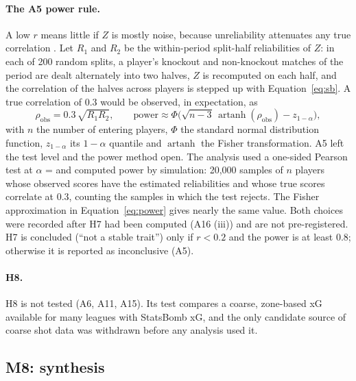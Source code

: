 \documentclass[11pt,a4paper]{article}
\begin{document}
\paragraph{The A5 power rule.}
A low $r$ means little if $Z$ is mostly noise, because unreliability
attenuates any true correlation \citep{spearman1904proof}. Let $R_1$ and $R_2$
be the within-period split-half reliabilities of $Z$: in each of 200 random
splits, a player's knockout and non-knockout matches of the period are dealt
alternately into two halves, $Z$ is recomputed on each half, and the
correlation of the halves across players is stepped up with
Equation~\eqref{eq:sb}. A true correlation of 0.3 would be observed, in
expectation, as
\begin{equation}
  \rho_{\text{obs}} = 0.3\,\sqrt{R_1 R_2},
  \qquad
  \text{power} \approx \Phi\big(\sqrt{n - 3}\,\operatorname{artanh}(\rho_{\text{obs}}) - z_{1-\alpha}\big),
  \label{eq:power}
\end{equation}
with $n$ the number of entering players, $\Phi$ the standard normal distribution
function, $z_{1-\alpha}$ its $1-\alpha$ quantile and $\operatorname{artanh}$ the
Fisher transformation. A5 left the test level and the power method open. The
analysis used a one-sided Pearson test at $\alpha$ = \HSevenAlpha{} and
computed power by simulation: 20,000 samples of $n$ players whose observed
scores have the estimated reliabilities and whose true scores correlate at 0.3,
counting the samples in which the test rejects. The Fisher approximation in
Equation~\eqref{eq:power} gives nearly the same value. Both choices were
recorded after H7 had been computed (A16 (iii)) and are not pre-registered.
H7 is concluded (``not a stable trait'') only if $r < 0.2$ and the power is at
least 0.8; otherwise it is reported as inconclusive (A5).

\paragraph{H8.}
H8 is not tested (A6, A11, A15). Its test compares a coarse, zone-based xG
available for many leagues with StatsBomb xG, and the only candidate source of
coarse shot data was withdrawn before any analysis used it.

\subsection{M8: synthesis}
\label{sec:m8}
\end{document}
